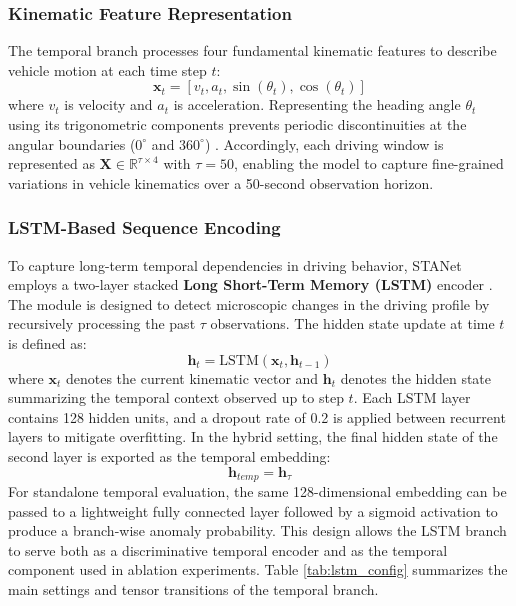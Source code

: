 \documentclass[journal]{IEEEtran}
\begin{document}
\subsubsection{Kinematic Feature Representation}
The temporal branch processes four fundamental kinematic features to describe vehicle motion at each time step $t$:
\begin{equation}
  \mathbf{x}_t = [v_t, a_t, \sin(\theta_t), \cos(\theta_t)]
\end{equation}
where $v_t$ is velocity and $a_t$ is acceleration. Representing the heading angle $\theta_t$ using its trigonometric components prevents periodic discontinuities at the angular boundaries ($0^\circ$ and $360^\circ$) \cite{taheri_sarteshnizi_applicability_2026}. Accordingly, each driving window is represented as $\mathbf{X} \in \mathbb{R}^{\tau \times 4}$ with $\tau = 50$, enabling the model to capture fine-grained variations in vehicle kinematics over a 50-second observation horizon.

\subsubsection{LSTM-Based Sequence Encoding}
To capture long-term temporal dependencies in driving behavior, STANet employs a two-layer stacked \textbf{Long Short-Term Memory (LSTM)} encoder \cite{zhou_hybrid_2022, taheri_sarteshnizi_applicability_2026, hirata_traffic_2025}. The module is designed to detect microscopic changes in the driving profile by recursively processing the past $\tau$ observations. The hidden state update at time $t$ is defined as:
\begin{equation}
  \mathbf{h}_t = \text{LSTM}(\mathbf{x}_t, \mathbf{h}_{t-1})
\end{equation}
where $\mathbf{x}_t$ denotes the current kinematic vector and $\mathbf{h}_t$ denotes the hidden state summarizing the temporal context observed up to step $t$. Each LSTM layer contains 128 hidden units, and a dropout rate of 0.2 is applied between recurrent layers to mitigate overfitting. In the hybrid setting, the final hidden state of the second layer is exported as the temporal embedding:
\begin{equation}
  \mathbf{h}_{temp} = \mathbf{h}_\tau
\end{equation}
For standalone temporal evaluation, the same 128-dimensional embedding can be passed to a lightweight fully connected layer followed by a sigmoid activation to produce a branch-wise anomaly probability. This design allows the LSTM branch to serve both as a discriminative temporal encoder and as the temporal component used in ablation experiments. Table \ref{tab:lstm_config} summarizes the main settings and tensor transitions of the temporal branch.
\end{document}
